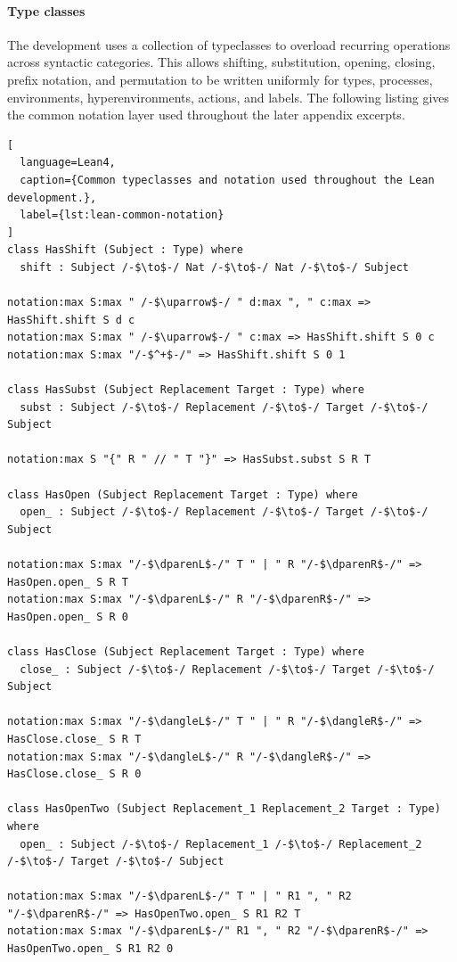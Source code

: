\paragraph{Type classes} The development uses a collection of typeclasses to overload recurring operations across syntactic categories. This allows shifting, substitution, opening, closing, prefix notation, and permutation to be written uniformly for types, processes, environments, hyperenvironments, actions, and labels. The following listing gives the common notation layer used throughout the later appendix excerpts.

\begin{lstlisting}[
  language=Lean4,
  caption={Common typeclasses and notation used throughout the Lean development.},
  label={lst:lean-common-notation}
]
class HasShift (Subject : Type) where
  shift : Subject /-$\to$-/ Nat /-$\to$-/ Nat /-$\to$-/ Subject

notation:max S:max " /-$\uparrow$-/ " d:max ", " c:max => HasShift.shift S d c
notation:max S:max " /-$\uparrow$-/ " c:max => HasShift.shift S 0 c
notation:max S:max "/-$^+$-/" => HasShift.shift S 0 1

class HasSubst (Subject Replacement Target : Type) where
  subst : Subject /-$\to$-/ Replacement /-$\to$-/ Target /-$\to$-/ Subject

notation:max S "{" R " // " T "}" => HasSubst.subst S R T

class HasOpen (Subject Replacement Target : Type) where
  open_ : Subject /-$\to$-/ Replacement /-$\to$-/ Target /-$\to$-/ Subject

notation:max S:max "/-$\dparenL$-/" T " | " R "/-$\dparenR$-/" => HasOpen.open_ S R T
notation:max S:max "/-$\dparenL$-/" R "/-$\dparenR$-/" => HasOpen.open_ S R 0

class HasClose (Subject Replacement Target : Type) where
  close_ : Subject /-$\to$-/ Replacement /-$\to$-/ Target /-$\to$-/ Subject

notation:max S:max "/-$\dangleL$-/" T " | " R "/-$\dangleR$-/" => HasClose.close_ S R T
notation:max S:max "/-$\dangleL$-/" R "/-$\dangleR$-/" => HasClose.close_ S R 0

class HasOpenTwo (Subject Replacement_1 Replacement_2 Target : Type) where
  open_ : Subject /-$\to$-/ Replacement_1 /-$\to$-/ Replacement_2 /-$\to$-/ Target /-$\to$-/ Subject

notation:max S:max "/-$\dparenL$-/" T " | " R1 ", " R2 "/-$\dparenR$-/" => HasOpenTwo.open_ S R1 R2 T
notation:max S:max "/-$\dparenL$-/" R1 ", " R2 "/-$\dparenR$-/" => HasOpenTwo.open_ S R1 R2 0


\end{lstlisting}

